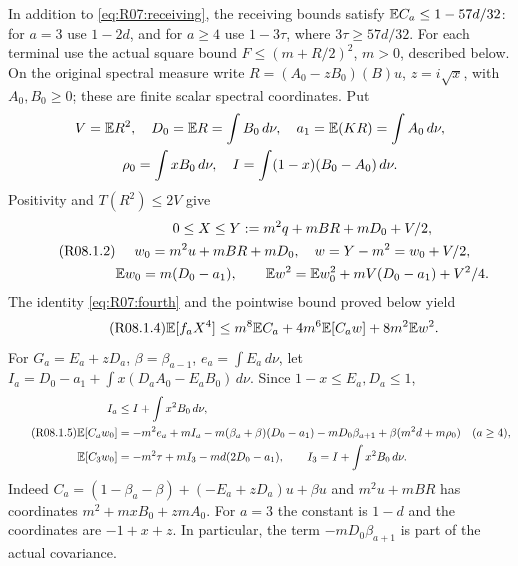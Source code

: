 In addition to \eqref{eq:R07:receiving}, the receiving bounds satisfy
$\mathbb E C_a\le1-57d/32$: for $a=3$ use $1-2d$, and for $a\ge4$ use
$1-3\tau$, where $3\tau\ge57d/32$.
For each terminal use the actual square bound $F\le(m+R/2)^2$,
$m>0$, described below. On the original spectral measure write
$R=(A_0-zB_0)(B)u$, $z=i\sqrt x$, with $A_0,B_0\ge0$; these are
finite scalar spectral coordinates. Put
\[
\begin{gathered}
 V=\mathbb E R^2,\quad D_0=\mathbb E R=\int B_0\,d\nu,\quad
 a_1=\mathbb E(KR)=\int A_0\,d\nu,\\
 \rho_0=\int xB_0\,d\nu,\quad
 I=\int(1-x)(B_0-A_0)\,d\nu.
\end{gathered}
\]
Positivity and $T(R^2)\le2V$ give
\begin{equation}\tag{R08.1.2}\label{eq:R08:Y}
\begin{gathered}
0\le X\le Y:=m^2q+mBR+mD_0+V/2,\\
w_0=m^2u+mBR+mD_0,\quad w=Y-m^2=w_0+V/2,\\
\mathbb E w_0=m(D_0-a_1),\qquad
\mathbb E w^2=\mathbb E w_0^2+mV(D_0-a_1)+V^2/4.
\end{gathered}
\end{equation}
The identity \eqref{eq:R07:fourth} and the pointwise bound proved below yield
\begin{equation}\tag{R08.1.4}\label{eq:R08:payment}
 \mathbb E[f_aX^4]\le m^8\mathbb E C_a+4m^6\mathbb E[C_aw]+8m^2\mathbb E w^2.
\end{equation}
For $G_a=E_a+zD_a$, $\beta=\beta_{a-1}$, $e_a=\int E_a\,d\nu$,
let
$I_a=D_0-a_1+\int x(D_aA_0-E_aB_0)\,d\nu$.
Since $1-x\le E_a,D_a\le1$,
\begin{equation}\tag{R08.1.5}\label{eq:R08:mixing}
\begin{aligned}
 I_a&\le I+\int x^2B_0\,d\nu,\\
 \mathbb E[C_aw_0]&=-m^2e_a+mI_a-m(\beta_a+\beta)(D_0-a_1)
 -mD_0\beta_{a+1}+\beta(m^2d+m\rho_0)\quad(a\ge4),\\
 \mathbb E[C_3w_0]&=-m^2\tau+mI_3-md(2D_0-a_1),\qquad
 I_3=I+\int x^2B_0\,d\nu.
\end{aligned}
\end{equation}
Indeed $C_a=(1-\beta_a-\beta)+(-E_a+zD_a)u+\beta u$ and
$m^2u+mBR$ has coordinates $m^2+mxB_0+zmA_0$.
For $a=3$ the constant is $1-d$ and the coordinates are $-1+x+z$.
In particular, the term $-mD_0\beta_{a+1}$ is part of the actual covariance.

